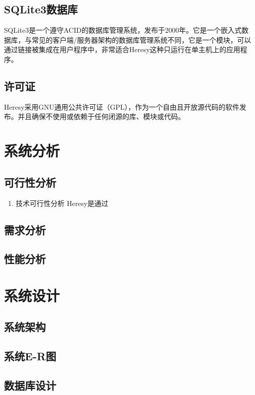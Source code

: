 \documentclass[12pt,a4paper]{article}%
\begin{document}
\subsection{SQLite3数据库}
SQLite3是一个遵守ACID的数据库管理系统，发布于2000年。它是一个嵌入式数据库，与常见的客户端/服务器架构的数据库管理系统不同，它是一个模块，可以通过链接被集成在用户程序中，非常适合Heresy这种只运行在单主机上的应用程序。

\subsection{许可证}
Heresy采用GNU通用公共许可证（GPL），作为一个自由且开放源代码的软件发布。并且确保不使用或依赖于任何闭源的库、模块或代码。

\newpage

\section{系统分析}
\subsection{可行性分析}
\begin{enumerate}[1)]
    \item 技术可行性分析
        Heresy是通过
\end{enumerate}

\subsection{需求分析}
\subsection{性能分析}

\newpage

\section{系统设计}
\subsection{系统架构}
\subsection{系统E-R图}
\subsection{数据库设计}
\end{document}
